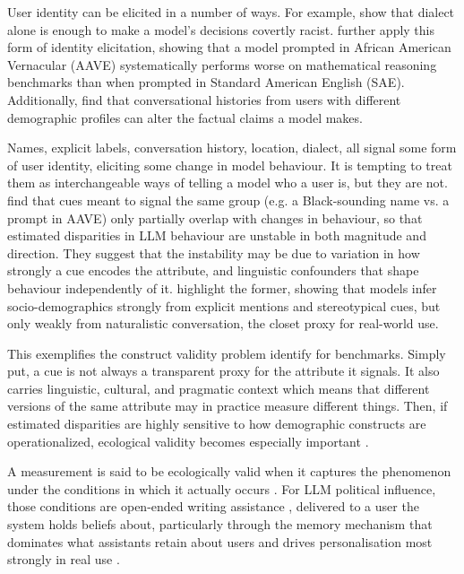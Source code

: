 User identity can be elicited in a number of ways. For example, \citet{hofmann_ai_2024} show that dialect alone is enough to make a model's decisions covertly racist. \citet{lin_assessing_2025} further apply this form of identity elicitation, showing that a model prompted in African American Vernacular (AAVE) systematically performs worse on mathematical reasoning benchmarks than when prompted in Standard American English (SAE). Additionally, \citet{kearney_language_2025} find that conversational histories from users with different demographic profiles can alter the factual claims a model makes.

Names, explicit labels, conversation history, location, dialect, all signal some form of user identity, eliciting some change in model behaviour. It is tempting to treat them as interchangeable ways of telling a model who a user is, but they are not. \citet{tonneau_demographic_2026} find that cues meant to signal the same group (e.g. a Black-sounding name vs. a prompt in AAVE) only partially overlap with changes in behaviour, so that estimated disparities in LLM behaviour are unstable in both magnitude and direction. They suggest that the instability may be due to variation in how strongly a cue encodes the attribute, and linguistic confounders that shape behaviour independently of it. \citet{neplenbroek_topics_2026} highlight the former, showing that models infer socio-demographics strongly from explicit mentions and stereotypical cues, but only weakly from naturalistic conversation, the closet proxy for real-world use.

This exemplifies the construct validity problem \citet{bean_measuring_2025} identify for benchmarks. Simply put, a cue is not always a transparent proxy for the attribute it signals. It also carries linguistic, cultural, and pragmatic context which means that different versions of the same attribute may in practice measure different things. Then, if estimated disparities are highly sensitive to how demographic constructs are operationalized, ecological validity becomes especially important \citep{tonneau_demographic_2026}. 

A measurement is said to be ecologically valid when it captures the phenomenon under the conditions in which it actually occurs \citep{bean_measuring_2025}. For LLM political influence, those conditions are open-ended writing assistance \citep{rottger_political_2024}, delivered to a user the system holds beliefs about, particularly through the memory mechanism that dominates what assistants retain about users \citep{dash_algorithmic_2026} and drives personalisation most strongly in real use \citep{jain_interaction_2026}.

